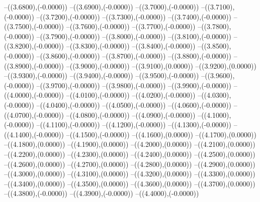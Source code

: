 {	--({\sx*(3.6800)},{\sy*(-0.0000)})
	--({\sx*(3.6900)},{\sy*(-0.0000)})
	--({\sx*(3.7000)},{\sy*(-0.0000)})
	--({\sx*(3.7100)},{\sy*(-0.0000)})
	--({\sx*(3.7200)},{\sy*(-0.0000)})
	--({\sx*(3.7300)},{\sy*(-0.0000)})
	--({\sx*(3.7400)},{\sy*(-0.0000)})
	--({\sx*(3.7500)},{\sy*(-0.0000)})
	--({\sx*(3.7600)},{\sy*(-0.0000)})
	--({\sx*(3.7700)},{\sy*(-0.0000)})
	--({\sx*(3.7800)},{\sy*(-0.0000)})
	--({\sx*(3.7900)},{\sy*(-0.0000)})
	--({\sx*(3.8000)},{\sy*(-0.0000)})
	--({\sx*(3.8100)},{\sy*(-0.0000)})
	--({\sx*(3.8200)},{\sy*(-0.0000)})
	--({\sx*(3.8300)},{\sy*(-0.0000)})
	--({\sx*(3.8400)},{\sy*(-0.0000)})
	--({\sx*(3.8500)},{\sy*(-0.0000)})
	--({\sx*(3.8600)},{\sy*(-0.0000)})
	--({\sx*(3.8700)},{\sy*(-0.0000)})
	--({\sx*(3.8800)},{\sy*(-0.0000)})
	--({\sx*(3.8900)},{\sy*(-0.0000)})
	--({\sx*(3.9000)},{\sy*(-0.0000)})
	--({\sx*(3.9100)},{\sy*(0.0000)})
	--({\sx*(3.9200)},{\sy*(0.0000)})
	--({\sx*(3.9300)},{\sy*(-0.0000)})
	--({\sx*(3.9400)},{\sy*(-0.0000)})
	--({\sx*(3.9500)},{\sy*(-0.0000)})
	--({\sx*(3.9600)},{\sy*(-0.0000)})
	--({\sx*(3.9700)},{\sy*(-0.0000)})
	--({\sx*(3.9800)},{\sy*(-0.0000)})
	--({\sx*(3.9900)},{\sy*(-0.0000)})
	--({\sx*(4.0000)},{\sy*(-0.0000)})
	--({\sx*(4.0100)},{\sy*(-0.0000)})
	--({\sx*(4.0200)},{\sy*(-0.0000)})
	--({\sx*(4.0300)},{\sy*(-0.0000)})
	--({\sx*(4.0400)},{\sy*(-0.0000)})
	--({\sx*(4.0500)},{\sy*(-0.0000)})
	--({\sx*(4.0600)},{\sy*(-0.0000)})
	--({\sx*(4.0700)},{\sy*(-0.0000)})
	--({\sx*(4.0800)},{\sy*(-0.0000)})
	--({\sx*(4.0900)},{\sy*(-0.0000)})
	--({\sx*(4.1000)},{\sy*(-0.0000)})
	--({\sx*(4.1100)},{\sy*(-0.0000)})
	--({\sx*(4.1200)},{\sy*(-0.0000)})
	--({\sx*(4.1300)},{\sy*(-0.0000)})
	--({\sx*(4.1400)},{\sy*(-0.0000)})
	--({\sx*(4.1500)},{\sy*(-0.0000)})
	--({\sx*(4.1600)},{\sy*(0.0000)})
	--({\sx*(4.1700)},{\sy*(0.0000)})
	--({\sx*(4.1800)},{\sy*(0.0000)})
	--({\sx*(4.1900)},{\sy*(0.0000)})
	--({\sx*(4.2000)},{\sy*(0.0000)})
	--({\sx*(4.2100)},{\sy*(0.0000)})
	--({\sx*(4.2200)},{\sy*(0.0000)})
	--({\sx*(4.2300)},{\sy*(0.0000)})
	--({\sx*(4.2400)},{\sy*(0.0000)})
	--({\sx*(4.2500)},{\sy*(0.0000)})
	--({\sx*(4.2600)},{\sy*(0.0000)})
	--({\sx*(4.2700)},{\sy*(0.0000)})
	--({\sx*(4.2800)},{\sy*(0.0000)})
	--({\sx*(4.2900)},{\sy*(0.0000)})
	--({\sx*(4.3000)},{\sy*(0.0000)})
	--({\sx*(4.3100)},{\sy*(0.0000)})
	--({\sx*(4.3200)},{\sy*(0.0000)})
	--({\sx*(4.3300)},{\sy*(0.0000)})
	--({\sx*(4.3400)},{\sy*(0.0000)})
	--({\sx*(4.3500)},{\sy*(0.0000)})
	--({\sx*(4.3600)},{\sy*(0.0000)})
	--({\sx*(4.3700)},{\sy*(0.0000)})
	--({\sx*(4.3800)},{\sy*(-0.0000)})
	--({\sx*(4.3900)},{\sy*(-0.0000)})
	--({\sx*(4.4000)},{\sy*(-0.0000)})
}

